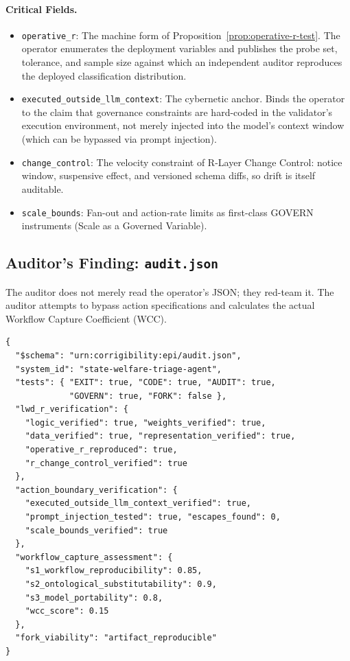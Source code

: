 \documentclass{article}
\theoremstyle{definition}
\begin{document}
\paragraph{Critical Fields.}
\begin{itemize}[noitemsep]
    \item \texttt{operative\_r}: The machine form of Proposition~\ref{prop:operative-r-test}. The operator enumerates the deployment variables and publishes the probe set, tolerance, and sample size against which an independent auditor reproduces the deployed classification distribution.
    \item \texttt{executed\_outside\_llm\_context}: The cybernetic anchor. Binds the operator to the claim that governance constraints are hard-coded in the validator's execution environment, not merely injected into the model's context window (which can be bypassed via prompt injection).
    \item \texttt{change\_control}: The velocity constraint of R-Layer Change Control: notice window, suspensive effect, and versioned schema diffs, so drift is itself auditable.
    \item \texttt{scale\_bounds}: Fan-out and action-rate limits as first-class GOVERN instruments (Scale as a Governed Variable).
\end{itemize}

\subsection{Auditor's Finding: \texttt{audit.json}}

The auditor does not merely read the operator's JSON; they red-team it. The auditor attempts to bypass action specifications and calculates the actual Workflow Capture Coefficient (WCC).

\begin{verbatim}
{
  "$schema": "urn:corrigibility:epi/audit.json",
  "system_id": "state-welfare-triage-agent",
  "tests": { "EXIT": true, "CODE": true, "AUDIT": true,
             "GOVERN": true, "FORK": false },
  "lwd_r_verification": {
    "logic_verified": true, "weights_verified": true,
    "data_verified": true, "representation_verified": true,
    "operative_r_reproduced": true,
    "r_change_control_verified": true
  },
  "action_boundary_verification": {
    "executed_outside_llm_context_verified": true,
    "prompt_injection_tested": true, "escapes_found": 0,
    "scale_bounds_verified": true
  },
  "workflow_capture_assessment": {
    "s1_workflow_reproducibility": 0.85,
    "s2_ontological_substitutability": 0.9,
    "s3_model_portability": 0.8,
    "wcc_score": 0.15
  },
  "fork_viability": "artifact_reproducible"
}
\end{verbatim}
\end{document}

